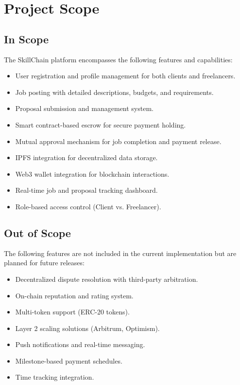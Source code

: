 \section{Project Scope}

\subsection{In Scope}

The SkillChain platform encompasses the following features and capabilities:

\begin{itemize}
    \item User registration and profile management for both clients and freelancers.
    \item Job posting with detailed descriptions, budgets, and requirements.
    \item Proposal submission and management system.
    \item Smart contract-based escrow for secure payment holding.
    \item Mutual approval mechanism for job completion and payment release.
    \item IPFS integration for decentralized data storage.
    \item Web3 wallet integration for blockchain interactions.
    \item Real-time job and proposal tracking dashboard.
    \item Role-based access control (Client vs. Freelancer).
\end{itemize}

\subsection{Out of Scope}

The following features are not included in the current implementation but are planned for future releases:

\begin{itemize}
    \item Decentralized dispute resolution with third-party arbitration.
    \item On-chain reputation and rating system.
    \item Multi-token support (ERC-20 tokens).
    \item Layer 2 scaling solutions (Arbitrum, Optimism).
    \item Push notifications and real-time messaging.
    \item Milestone-based payment schedules.
    \item Time tracking integration.
\end{itemize}

